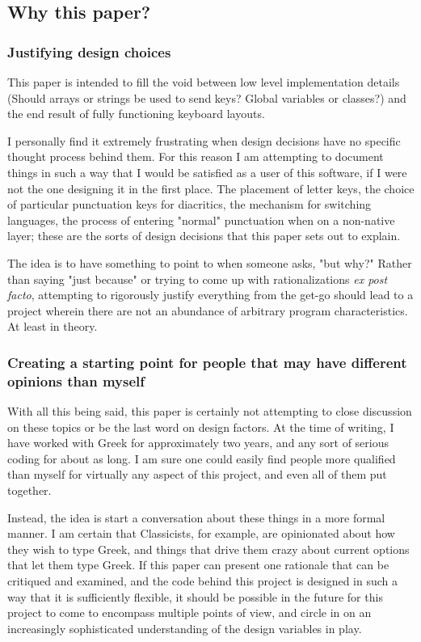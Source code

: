 \documentclass[11pt]{article}
\begin{document}
\subsection{Why this paper?}
\label{sec:orgeef378d}

\subsubsection{Justifying design choices}
\label{sec:org2c26611}

This paper is intended to fill the void between low level implementation details (Should arrays or strings be used to send keys? Global variables or classes?) and the end result of fully functioning keyboard layouts.

I personally find it extremely frustrating when design decisions have no specific thought process behind them. For this reason I am attempting to document things in such a way that I would be satisfied as a user of this software, if I were not the one designing it in the first place. The placement of letter keys, the choice of particular punctuation keys for diacritics, the mechanism for switching languages, the process of entering "normal" punctuation when on a non-native layer; these are the sorts of design decisions that this paper sets out to explain.

The idea is to have something to point to when someone asks, "but why?" Rather than saying "just because" or trying to come up with rationalizations \emph{ex post facto}, attempting to rigorously justify everything from the get-go should lead to a project wherein there are not an abundance of arbitrary program characteristics. At least in theory.

\subsubsection{Creating a starting point for people that may have different opinions than myself}
\label{sec:org392924c}

With all this being said, this paper is certainly not attempting to close discussion on these topics or be the last word on design factors. At the time of writing, I have worked with Greek for approximately two years, and any sort of serious coding for about as long. I am sure one could easily find people more qualified than myself for virtually any aspect of this project, and even all of them put together.

Instead, the idea is start a conversation about these things in a more formal manner. I am certain that Classicists, for example, are opinionated about how they wish to type Greek, and things that drive them crazy about current options that let them type Greek. If this paper can present one rationale that can be critiqued and examined, and the code behind this project is designed in such a way that it is sufficiently flexible, it should be possible in the future for this project to come to encompass multiple points of view, and circle in on an increasingly sophisticated understanding of the design variables in play.
\end{document}
